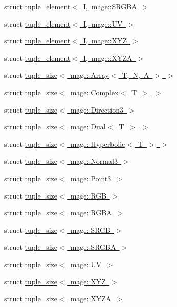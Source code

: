 \begin{DoxyCompactItemize}
struct \mbox{\hyperlink{structstd_1_1tuple__element_3_01_i_00_01mage_1_1_s_r_g_b_a_01_4}{tuple\+\_\+element$<$ I, mage\+::\+S\+R\+G\+B\+A $>$}}
\item 
struct \mbox{\hyperlink{structstd_1_1tuple__element_3_01_i_00_01mage_1_1_u_v_01_4}{tuple\+\_\+element$<$ I, mage\+::\+U\+V $>$}}
\item 
struct \mbox{\hyperlink{structstd_1_1tuple__element_3_01_i_00_01mage_1_1_x_y_z_01_4}{tuple\+\_\+element$<$ I, mage\+::\+X\+Y\+Z $>$}}
\item 
struct \mbox{\hyperlink{structstd_1_1tuple__element_3_01_i_00_01mage_1_1_x_y_z_a_01_4}{tuple\+\_\+element$<$ I, mage\+::\+X\+Y\+Z\+A $>$}}
\item 
struct \mbox{\hyperlink{structstd_1_1tuple__size_3_01mage_1_1_array_3_01_t_00_01_n_00_01_a_01_4_01_4}{tuple\+\_\+size$<$ mage\+::\+Array$<$ T, N, A $>$ $>$}}
\item 
struct \mbox{\hyperlink{structstd_1_1tuple__size_3_01mage_1_1_complex_3_01_t_01_4_01_4}{tuple\+\_\+size$<$ mage\+::\+Complex$<$ T $>$ $>$}}
\item 
struct \mbox{\hyperlink{structstd_1_1tuple__size_3_01mage_1_1_direction3_01_4}{tuple\+\_\+size$<$ mage\+::\+Direction3 $>$}}
\item 
struct \mbox{\hyperlink{structstd_1_1tuple__size_3_01mage_1_1_dual_3_01_t_01_4_01_4}{tuple\+\_\+size$<$ mage\+::\+Dual$<$ T $>$ $>$}}
\item 
struct \mbox{\hyperlink{structstd_1_1tuple__size_3_01mage_1_1_hyperbolic_3_01_t_01_4_01_4}{tuple\+\_\+size$<$ mage\+::\+Hyperbolic$<$ T $>$ $>$}}
\item 
struct \mbox{\hyperlink{structstd_1_1tuple__size_3_01mage_1_1_normal3_01_4}{tuple\+\_\+size$<$ mage\+::\+Normal3 $>$}}
\item 
struct \mbox{\hyperlink{structstd_1_1tuple__size_3_01mage_1_1_point3_01_4}{tuple\+\_\+size$<$ mage\+::\+Point3 $>$}}
\item 
struct \mbox{\hyperlink{structstd_1_1tuple__size_3_01mage_1_1_r_g_b_01_4}{tuple\+\_\+size$<$ mage\+::\+R\+G\+B $>$}}
\item 
struct \mbox{\hyperlink{structstd_1_1tuple__size_3_01mage_1_1_r_g_b_a_01_4}{tuple\+\_\+size$<$ mage\+::\+R\+G\+B\+A $>$}}
\item 
struct \mbox{\hyperlink{structstd_1_1tuple__size_3_01mage_1_1_s_r_g_b_01_4}{tuple\+\_\+size$<$ mage\+::\+S\+R\+G\+B $>$}}
\item 
struct \mbox{\hyperlink{structstd_1_1tuple__size_3_01mage_1_1_s_r_g_b_a_01_4}{tuple\+\_\+size$<$ mage\+::\+S\+R\+G\+B\+A $>$}}
\item 
struct \mbox{\hyperlink{structstd_1_1tuple__size_3_01mage_1_1_u_v_01_4}{tuple\+\_\+size$<$ mage\+::\+U\+V $>$}}
\item 
struct \mbox{\hyperlink{structstd_1_1tuple__size_3_01mage_1_1_x_y_z_01_4}{tuple\+\_\+size$<$ mage\+::\+X\+Y\+Z $>$}}
\item 
struct \mbox{\hyperlink{structstd_1_1tuple__size_3_01mage_1_1_x_y_z_a_01_4}{tuple\+\_\+size$<$ mage\+::\+X\+Y\+Z\+A $>$}}
\end{DoxyCompactItemize}
